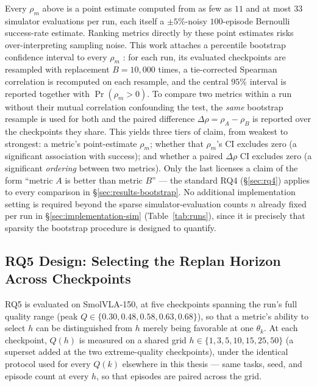\documentclass[english,12pt,a4paper,pdftex,elec,utf8]{aaltothesis}
\begin{document}
Every $\rho_m$ above is a point estimate computed from as few as $11$ and at most $33$ simulator evaluations per run, each itself a $\pm5\%$-noisy $100$-episode Bernoulli success-rate estimate. Ranking metrics directly by these point estimates risks over-interpreting sampling noise. This work attaches a percentile bootstrap confidence interval to every $\rho_m$ \cite{efron1979bootstrap,efron1993bootstrap}: for each run, its evaluated checkpoints are resampled with replacement $B=10{,}000$ times, a tie-corrected Spearman correlation is recomputed on each resample, and the central $95\%$ interval is reported together with $\Pr(\rho_m>0)$. To compare two metrics within a
run without their mutual correlation confounding the test, the \emph{same} bootstrap resample is used for both and the paired difference $\Delta\rho=\rho_A-\rho_B$ is reported over the checkpoints they share.
This yields three tiers of claim, from weakest to strongest: a metric's point-estimate $\rho_m$; whether that $\rho_m$'s CI excludes zero (a significant association with success); and whether a paired $\Delta\rho$ CI excludes zero (a significant \emph{ordering} between two metrics). Only the last licenses a claim of the form ``metric $A$ is better than metric $B$'' --- the standard RQ4 (\S\ref{sec:rq4}) applies to every comparison in \S\ref{sec:results-bootstrap}. No additional implementation setting is required beyond the sparse simulator-evaluation counts $n$ already fixed per run in \S\ref{sec:implementation-sim} (Table~\ref{tab:runs}), since it is precisely that sparsity the bootstrap procedure is designed to quantify.

\subsection{RQ5 Design: Selecting the Replan Horizon Across Checkpoints}
\label{sec:design-rq5}

RQ5 is evaluated on SmolVLA-150, at five checkpoints spanning the run's full quality range (peak $Q\in\{0.30,0.48,0.58,0.63,0.68\}$), so that a metric's ability to select $h$ can be distinguished from $h$ merely being favorable at one $\theta_k$. At each checkpoint, $Q(h)$ is measured on a shared grid $h\in\{1,3,5,10,15,25,50\}$ (a superset added at the two extreme-quality checkpoints), under the identical protocol used for every $Q(k)$ elsewhere in this thesis --- same tasks, seed, and episode count at every $h$, so that episodes are paired across the grid.
\end{document}
